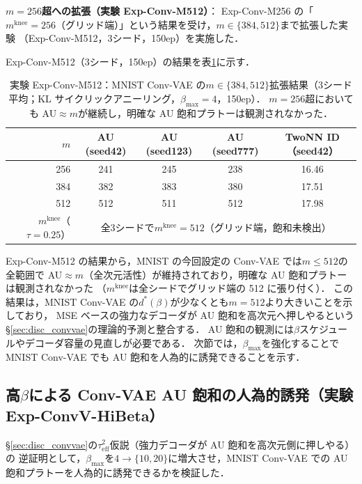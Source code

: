 \documentclass[11pt,a4paper]{jsarticle}
\newcommand{\mknee}{m^{\mathrm{knee}}}
\begin{document}
\textbf{$m=256$超への拡張（実験 Exp-Conv-M512）}：
Exp-Conv-M256 の「$\mknee=256$（グリッド端）」という結果を受け，$m \in \{384, 512\}$まで拡張した実験
（Exp-Conv-M512，3シード，150ep）を実施した．

Exp-Conv-M512（3シード，150ep）の結果を表\ref{tab:en_ext}に示す．

\begin{table}[H]
\centering
\caption{実験 Exp-Conv-M512：MNIST Conv-VAE の$m \in \{384, 512\}$拡張結果（3シード平均；KL サイクリックアニーリング，$\beta_{\max}=4$，150ep）．
$m=256$超においても AU$\approx m$が継続し，明確な AU 飽和プラトーは観測されなかった．}
\label{tab:en_ext}
\small
\begin{tabular}{r ccc c}
\toprule
$m$ & AU (seed42) & AU (seed123) & AU (seed777) & TwoNN ID（seed42） \\
\midrule
256 & 241 & 245 & 238 & 16.46 \\
384 & 382 & 383 & 380 & 17.51 \\
512 & 512 & 511 & 512 & 17.98 \\
\midrule
$\mknee$（$\tau=0.25$） & \multicolumn{4}{c}{全3シードで$\mknee=512$（グリッド端，飽和未検出）} \\
\bottomrule
\end{tabular}
\end{table}

Exp-Conv-M512 の結果から，MNIST の今回設定の Conv-VAE では$m \leq 512$の全範囲で
AU$\approx m$（全次元活性）が維持されており，明確な AU 飽和プラトーは観測されなかった
（$\mknee$は全シードでグリッド端の 512 に張り付く）．
この結果は，MNIST Conv-VAE の$d^*(\beta)$が少なくとも$m=512$より大きいことを示しており，
MSE ベースの強力なデコーダが AU 飽和を高次元へ押しやるという
§\ref{sec:disc_convvae}の理論的予測と整合する．
AU 飽和の観測には$\beta$スケジュールやデコーダ容量の見直しが必要である．
次節では，$\beta_{\max}$を強化することで MNIST Conv-VAE でも AU 飽和を人為的に誘発できることを示す．

\subsection{高$\beta$による Conv-VAE AU 飽和の人為的誘発（実験 Exp-ConvV-HiBeta）}\label{sec:exp_hibeta}

§\ref{sec:disc_convvae}の$\tau^2_\mathrm{eff}$仮説（強力デコーダが AU 飽和を高次元側に押しやる）の
逆証明として，$\beta_{\max}$を$4 \to \{10, 20\}$に増大させ，MNIST Conv-VAE での
AU 飽和プラトーを人為的に誘発できるかを検証した．
\end{document}
